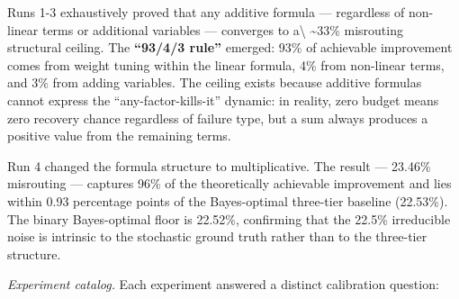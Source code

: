 \documentclass[
  10pt,
]{article}
\begin{document}
Runs 1-3 exhaustively proved that any additive formula --- regardless of
non-linear terms or additional variables --- converges to
a\textbackslash{} \textasciitilde33\% misrouting structural ceiling. The
\textbf{``93/4/3 rule''} emerged: 93\% of achievable improvement comes
from weight tuning within the linear formula, 4\% from non-linear terms,
and 3\% from adding variables. The ceiling exists because additive
formulas cannot express the ``any-factor-kills-it'' dynamic: in reality,
zero budget means zero recovery chance regardless of failure type, but a
sum always produces a positive value from the remaining terms.

Run 4 changed the formula structure to multiplicative. The result ---
23.46\% misrouting --- captures 96\% of the theoretically achievable
improvement and lies within 0.93 percentage points of the Bayes-optimal
three-tier baseline (22.53\%). The binary Bayes-optimal floor is
22.52\%, confirming that the 22.5\% irreducible noise is intrinsic to
the stochastic ground truth rather than to the three-tier structure.

\emph{Experiment catalog.} Each experiment answered a distinct
calibration question:
\end{document}
